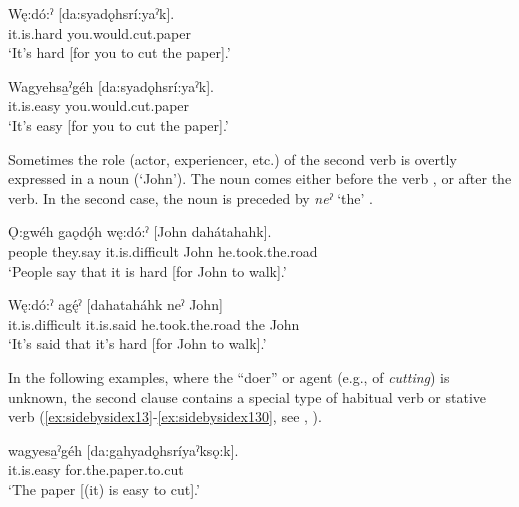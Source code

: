 \ea\label{ex:sidebysidex8} 
\gll Wę:dó:ˀ [da:syadǫhsrí:yaˀk].\\
it.is.hard you.would.cut.paper\\
\glt ‘It’s hard [for you to cut the paper].’
\z

\ea\label{ex:sidebysidex9} 
\gll Wagyehsa̱ˀgéh [da:syadǫhsrí:yaˀk].\\
it.is.easy you.would.cut.paper\\
\glt ‘It’s easy [for you to cut the paper].’
\z

Sometimes the role (actor, experiencer, etc.) of the second verb is overtly expressed in a noun (‘John’). The noun comes either before the verb , or after the verb. In the second case, the noun is preceded by \textit{neˀ} ‘the’ . 

\ea\label{ex:sidebysidex10} 
\gll Ǫ:gwéh gaǫdǫ́h wę:dó:ˀ [John dahátahahk].\\
people they.say it.is.difficult John he.took.the.road\\
\glt ‘People say that it is hard [for John to walk].’
\z

\ea\label{ex:sidebysidex11} 
\gll Wę:dó:ˀ agę́ˀ [dahataháhk neˀ John]\\
it.is.difficult it.is.said he.took.the.road the John\\
\glt ‘It’s said that it’s hard [for John to walk].’
\z

In the following examples, where the “doer” or agent (e.g., of \emph{cutting}) is unknown, the second clause contains a special type of habitual verb  or stative verb (\ref{ex:sidebysidex13}-\ref{ex:sidebysidex130}, see , ).

\ea\label{ex:sidebysidex12} 
\gll wagyesa̱ˀgéh [da:ga̱hyadǫ̱hsríyaˀksǫ:k].\\
it.is.easy for.the.paper.to.cut\\
\glt ‘The paper [(it) is easy to cut].’
\z

